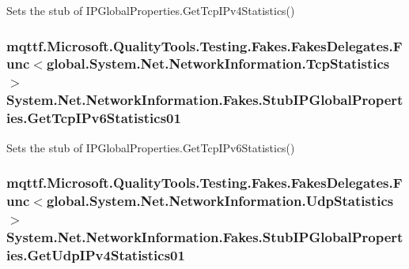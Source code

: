 Sets the stub of I\-P\-Global\-Properties.\-Get\-Tcp\-I\-Pv4\-Statistics()

\hypertarget{class_system_1_1_net_1_1_network_information_1_1_fakes_1_1_stub_i_p_global_properties_a9b271ef0385cb214a5fdf1226c7f3f7c}{
\subsubsection[{Get\-Tcp\-I\-Pv6\-Statistics01}]{\setlength{\rightskip}{0pt plus 5cm}mqttf.\-Microsoft.\-Quality\-Tools.\-Testing.\-Fakes.\-Fakes\-Delegates.\-Func$<$global.\-System.\-Net.\-Network\-Information.\-Tcp\-Statistics$>$ System.\-Net.\-Network\-Information.\-Fakes.\-Stub\-I\-P\-Global\-Properties.\-Get\-Tcp\-I\-Pv6\-Statistics01}}\label{class_system_1_1_net_1_1_network_information_1_1_fakes_1_1_stub_i_p_global_properties_a9b271ef0385cb214a5fdf1226c7f3f7c}


Sets the stub of I\-P\-Global\-Properties.\-Get\-Tcp\-I\-Pv6\-Statistics()

\hypertarget{class_system_1_1_net_1_1_network_information_1_1_fakes_1_1_stub_i_p_global_properties_af03f489ef0b4663c7aedd7bf07d652db}{
\subsubsection[{Get\-Udp\-I\-Pv4\-Statistics01}]{\setlength{\rightskip}{0pt plus 5cm}mqttf.\-Microsoft.\-Quality\-Tools.\-Testing.\-Fakes.\-Fakes\-Delegates.\-Func$<$global.\-System.\-Net.\-Network\-Information.\-Udp\-Statistics$>$ System.\-Net.\-Network\-Information.\-Fakes.\-Stub\-I\-P\-Global\-Properties.\-Get\-Udp\-I\-Pv4\-Statistics01}}\label{class_system_1_1_net_1_1_network_information_1_1_fakes_1_1_stub_i_p_global_properties_af03f489ef0b4663c7aedd7bf07d652db}


